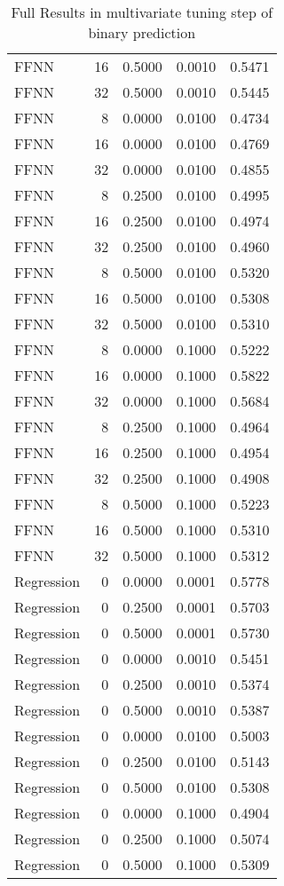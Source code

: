 \begin{table}[h!]
\begin{adjustbox}{max width=\textwidth}
\begin{tabular}{lrrrr}
  FFNN &    16 & 0.5000 & 0.0010 & 0.5471 \\ 
  FFNN &    32 & 0.5000 & 0.0010 & 0.5445 \\ 
  FFNN &     8 & 0.0000 & 0.0100 & 0.4734 \\ 
  FFNN &    16 & 0.0000 & 0.0100 & 0.4769 \\ 
  FFNN &    32 & 0.0000 & 0.0100 & 0.4855 \\ 
  FFNN &     8 & 0.2500 & 0.0100 & 0.4995 \\ 
  FFNN &    16 & 0.2500 & 0.0100 & 0.4974 \\ 
  FFNN &    32 & 0.2500 & 0.0100 & 0.4960 \\ 
  FFNN &     8 & 0.5000 & 0.0100 & 0.5320 \\ 
  FFNN &    16 & 0.5000 & 0.0100 & 0.5308 \\ 
  FFNN &    32 & 0.5000 & 0.0100 & 0.5310 \\ 
  FFNN &     8 & 0.0000 & 0.1000 & 0.5222 \\ 
  FFNN &    16 & 0.0000 & 0.1000 & 0.5822 \\ 
  FFNN &    32 & 0.0000 & 0.1000 & 0.5684 \\ 
  FFNN &     8 & 0.2500 & 0.1000 & 0.4964 \\ 
  FFNN &    16 & 0.2500 & 0.1000 & 0.4954 \\ 
  FFNN &    32 & 0.2500 & 0.1000 & 0.4908 \\ 
  FFNN &     8 & 0.5000 & 0.1000 & 0.5223 \\ 
  FFNN &    16 & 0.5000 & 0.1000 & 0.5310 \\ 
  FFNN &    32 & 0.5000 & 0.1000 & 0.5312 \\ 
  Regression &     0 & 0.0000 & 0.0001 & 0.5778 \\ 
  Regression &     0 & 0.2500 & 0.0001 & 0.5703 \\ 
  Regression &     0 & 0.5000 & 0.0001 & 0.5730 \\ 
  Regression &     0 & 0.0000 & 0.0010 & 0.5451 \\ 
  Regression &     0 & 0.2500 & 0.0010 & 0.5374 \\ 
  Regression &     0 & 0.5000 & 0.0010 & 0.5387 \\ 
  Regression &     0 & 0.0000 & 0.0100 & 0.5003 \\ 
  Regression &     0 & 0.2500 & 0.0100 & 0.5143 \\ 
  Regression &     0 & 0.5000 & 0.0100 & 0.5308 \\ 
  Regression &     0 & 0.0000 & 0.1000 & 0.4904 \\ 
  Regression &     0 & 0.2500 & 0.1000 & 0.5074 \\ 
  Regression &     0 & 0.5000 & 0.1000 & 0.5309 \\ 
   \hline
 \end{tabular}
\end{adjustbox}
\caption{Full Results in multivariate tuning step of binary prediction} 
\label{tab:binary.multivar.par.tuning.full}
\end{table}

